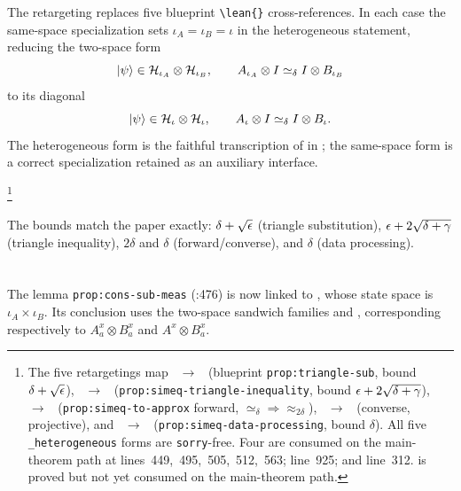 \documentclass[11pt]{article}
\begin{document}
The retargeting replaces five blueprint \verb|\lean{}| cross-references.  In each
case the same-space specialization sets \(\iota_A = \iota_B = \iota\) in the
heterogeneous statement, reducing the two-space form
\[
  \ket{\psi}\in\mathcal H_{\iota_A}\otimes\mathcal H_{\iota_B},\qquad
  A_{\iota_A}\otimes I \simeq_\delta I\otimes B_{\iota_B}
\]
to its diagonal
\[
  \ket{\psi}\in\mathcal H_\iota\otimes\mathcal H_\iota,\qquad
  A_\iota\otimes I \simeq_\delta I\otimes B_\iota .
\]
The heterogeneous form is the faithful transcription of
 in \cite[Section~3]{Ji2020LowIndividualDegree};
the same-space form is a correct specialization retained as an auxiliary
interface.%

\footnote{The five retargetings map
~$\to$~
(blueprint \texttt{prop:triangle-sub}, bound \(\delta+\sqrt{\epsilon}\)),
~$\to$~
(\texttt{prop:simeq-triangle-inequality}, bound \(\epsilon+2\sqrt{\delta+\gamma}\)),
~$\to$~
(\texttt{prop:simeq-to-approx} forward, \(\simeq_\delta\Rightarrow\approx_{2\delta}\)),
~$\to$~
(converse, projective), and
~$\to$~
(\texttt{prop:simeq-data-processing}, bound \(\delta\)).
All five \texttt{\_heterogeneous} forms are \texttt{sorry}-free.
Four are consumed on the main-theorem path at
lines~449,~495,~505,~512,~563;
 line~925; and
 line~312.
 is proved but not yet
consumed on the main-theorem path.}

The bounds match the paper exactly: \(\delta+\sqrt{\epsilon}\) (triangle substitution),
\(\epsilon+2\sqrt{\delta+\gamma}\) (triangle inequality),
\(2\delta\) and \(\delta\) (forward/converse), and \(\delta\) (data
processing).

\section{\texorpdfstring{}{consSubMeas\_heterogeneous}}

The lemma \verb|prop:cons-sub-meas| (:476) is
now linked to , whose state space is
\(\iota_A\times\iota_B\).  Its conclusion uses the two-space sandwich families
 and
, corresponding respectively to
\(A_a^x\otimes B_a^x\) and \(A^x\otimes B_a^x\).
\end{document}
